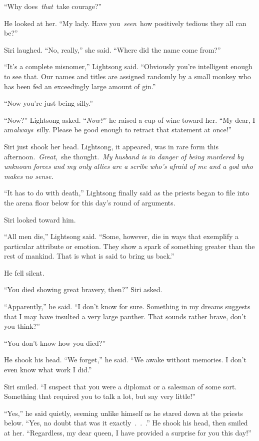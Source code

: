 “Why does~\textit{that}~take courage?”

He looked at her. “My lady. Have you~\textit{seen}~how positively tedious they all can be?”

Siri laughed. “No, really,” she said. “Where did the name come from?”

“It’s a complete misnomer,” Lightsong said. “Obviously you’re intelligent enough to see that. Our names and titles are assigned randomly by a small monkey who has been fed an exceedingly large amount of gin.”

“Now you’re just being silly.”

“Now?” Lightsong asked. “\textit{Now?}” he raised a cup of wine toward her. “My dear, I am\textit{always}~silly. Please be good enough to retract that statement at once!”

Siri just shook her head. Lightsong, it appeared, was in rare form this afternoon.~\textit{Great,}~she thought.~\textit{My husband is in danger of being murdered by unknown forces and my only allies are a scribe who’s afraid of me and a god who makes no sense.}

“It has to do with death,” Lightsong finally said as the priests began to file into the arena floor below for this day’s round of arguments.

Siri looked toward him.

“All men die,” Lightsong said. “Some, however, die in ways that exemplify a particular attribute or emotion. They show a spark of something greater than the rest of mankind. That is what is said to bring us back.”

He fell silent.

“You died showing great bravery, then?” Siri asked.

“Apparently,” he said. “I don’t know for sure. Something in my dreams suggests that I may have insulted a very large panther. That sounds rather brave, don’t you think?”

“You don’t know how you died?”

He shook his head. “We forget,” he said. “We awake without memories. I don’t even know what work I did.”

Siri smiled. “I suspect that you were a diplomat or a salesman of some sort. Something that required you to talk a lot, but say very little!”

“Yes,” he said quietly, seeming unlike himself as he stared down at the priests below. “Yes, no doubt that was it exactly~.~.~.” He shook his head, then smiled at her. “Regardless, my dear queen, I have provided a surprise for you this day!”

